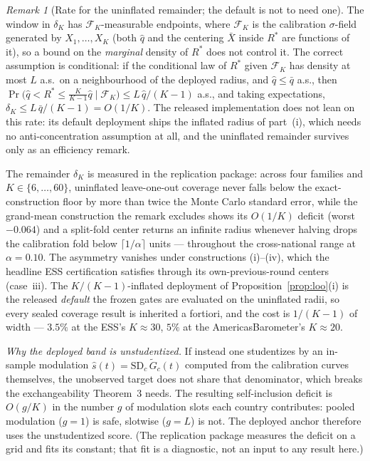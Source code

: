 \documentclass[12pt]{article}
\theoremstyle{definition}
\theoremstyle{remark}
\newtheorem{remark}{Remark}
\newcommand{\Gtilde}{\widetilde{G}}
\begin{document}
\begin{remark}[Rate for the uninflated remainder; the default is not to need
one]\label{rem:deltaK}
The window in $\delta_K$ has $\mathcal F_K$-measurable endpoints, where
$\mathcal F_K$ is the calibration $\sigma$-field generated by
$X_1,\dots,X_K$ (both $\widehat q$ and the centering $\bar X$ inside $R^*$
are functions of it), so a bound on the \emph{marginal} density of $R^*$ does
not control it. The correct assumption is conditional: if the conditional law
of $R^*$ given $\mathcal F_K$ has density at most $L$ a.s.\ on a
neighbourhood of the deployed radius, and $\widehat q\le\bar q$ a.s., then
$\Pr\big(\widehat q<R^*\le\tfrac{K}{K-1}\widehat q\mid\mathcal F_K\big)
\le L\,\widehat q/(K{-}1)$ a.s., and taking expectations,
$\delta_K\le L\,\bar q/(K{-}1)=O(1/K)$. The released implementation does not
lean on this rate: its default deployment ships the inflated radius of
part~(i), which needs no anti-concentration assumption at all, and the
uninflated remainder survives only as an efficiency remark.
\end{remark}

The remainder $\delta_K$ is measured in the replication package: across four families and $K\in\{6,\dots,60\}$, uninflated
leave-one-out coverage never falls below the exact-construction floor by more
than twice the Monte Carlo standard error, while the grand-mean construction
the remark excludes shows its $O(1/K)$ deficit (worst $-0.064$) and a
split-fold center returns an infinite radius whenever halving drops the
calibration fold below $\lceil1/\alpha\rceil$ units --- throughout the
cross-national range at $\alpha=0.10$. The asymmetry vanishes under
constructions (i)--(iv), which the headline ESS certification satisfies
through its own-previous-round centers (case~iii). The $K/(K{-}1)$-inflated
deployment of Proposition~\ref{prop:loo}(i) is the released \emph{default}
the frozen gates are
evaluated on the uninflated radii, so every sealed coverage result is
inherited a fortiori, and the cost is $1/(K-1)$ of width --- $3.5\%$ at the
ESS's $K\approx30$, $5\%$ at the AmericasBarometer's $K\approx20$.

\emph{Why the deployed band is unstudentized.} If instead one studentizes by
an in-sample modulation $\widehat s(t)=\mathrm{SD}_c\,\Gtilde_c(t)$ computed
from the calibration curves themselves, the unobserved target does not share
that denominator, which breaks the exchangeability Theorem~3 needs. The
resulting self-inclusion deficit is $O(g/K)$ in the number $g$ of modulation
slots each country contributes: pooled modulation ($g=1$) is safe, slotwise
($g=L$) is not. The deployed anchor therefore uses the unstudentized score.
(The replication package measures the deficit on a grid and fits its
constant; that fit is a diagnostic, not an input to any result here.)
\end{document}
